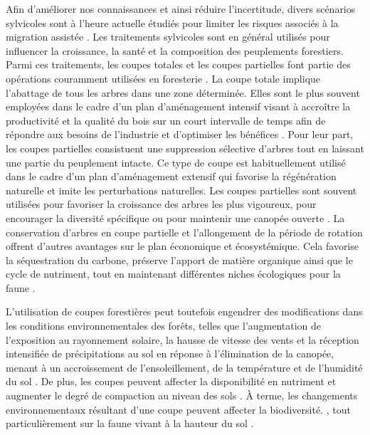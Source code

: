 Afin d'améliorer nos connaissances et ainsi réduire l'incertitude, divers scénarios sylvicoles sont à l'heure actuelle étudiés pour limiter les risques associés à la migration assistée \citep{royoDesiredREgenerationAssisted2023}.
Les traitements sylvicoles sont en général utilisés pour influencer la croissance, la santé et la composition des peuplements forestiers.
Parmi ces traitements, les coupes totales et les coupes partielles font partie des opérations couramment utilisées en foresterie \citep{Man2008Elevenyearresponses,Chaudhary2016Impactforest,MontoroGirona2018ConiferRegeneration,Ameray2021Forestcarbon}. 
La coupe totale implique l'abattage de tous les arbres dans une zone déterminée.
Elles sont le plus souvent employées dans le cadre d'un plan d'aménagement intensif visant à accroître la productivité et la qualité du bois 
sur un court intervalle de temps afin de répondre aux besoins de l'industrie et d'optimiser les bénéfices \citep{Ameray2021Forestcarbon}.
Pour leur part, les coupes partielles consistuent une suppression sélective d'arbres tout en laissant une partie du peuplement intacte.
Ce type de coupe est habituellement utilisé dans le cadre d'un plan d'aménagement extensif qui favorise la régénération naturelle et imite les perturbations naturelles.
Les coupes partielles sont souvent utilisées pour favoriser la croissance des arbres les plus vigoureux, pour encourager la diversité spécifique ou pour maintenir une canopée ouverte \citep{Irland2011Timberproductivity,Ameray2021Forestcarbon}.
La conservation d'arbres en coupe partielle et l'allongement de la période de rotation offrent d'autres avantages sur le plan économique et écosystémique. 
Cela favorise la séquestration du carbone, préserve l'apport de matière organique ainsi que le cycle de nutriment, 
tout en maintenant différentes niches écologiques pour la faune \citep{Barg1999Influencepartial,Tong2020Forestmanagement,Ameray2021Forestcarbon}.

L'utilisation de coupes forestières peut toutefois engendrer des modifications dans les conditions environnementales des forêts, 
telles que l'augmentation de l'exposition au rayonnement solaire, la hausse de vitesse des vents et la réception intensifiée de précipitations au sol en réponse à l'élimination de la canopée, 
menant à un accroissement de l'ensoleillement, de la température et de l'humidité du sol \citep{Keenan1993ecologicaleffects,Lindo2003Microbialbiomass,Heithecker2007Edgerelatedgradients}.
De plus, les coupes peuvent affecter la disponibilité en nutriment et augmenter le degré de compaction au niveau des sols \citep{Covington1981Changesforest,Lindo2003Microbialbiomass,Battigelli2004Shorttermimpact,rousseauLongtermEffectsBiomass2018}. 
À terme, les changements environnementaux résultant d'une coupe peuvent affecter la biodiversité. \citep{Paillet2010Biodiversitydifferences,Fedrowitz2014Canretention,Chaudhary2016Impactforest}, 
tout particulièrement sur la faune vivant à la hauteur du sol \citep{Lindo2003Microbialbiomass,Chaudhary2016Impactforest,Kudrin2023metaanalysiseffects}.

